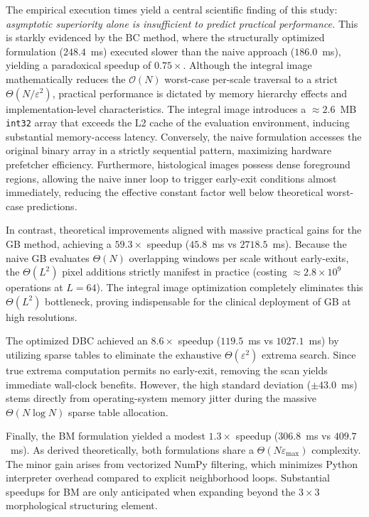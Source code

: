 The empirical execution times yield a central scientific finding of this study: \textit{asymptotic superiority alone is insufficient to predict practical performance.} This is starkly evidenced by the BC method, where the structurally optimized formulation ($248.4$~ms) executed slower than the naive approach ($186.0$~ms), yielding a paradoxical speedup of $0.75\times$. Although the integral image mathematically reduces the $\mathcal{O}(N)$ worst-case per-scale traversal to a strict $\Theta(N/\varepsilon^2)$, practical performance is dictated by memory hierarchy effects and implementation-level characteristics. The integral image introduces a $\approx 2.6$~MB \texttt{int32} array that exceeds the L2 cache of the evaluation environment, inducing substantial memory-access latency. Conversely, the naive formulation accesses the original binary array in a strictly sequential pattern, maximizing hardware prefetcher efficiency. Furthermore, histological images possess dense foreground regions, allowing the naive inner loop to trigger early-exit conditions almost immediately, reducing the effective constant factor well below theoretical worst-case predictions. 

In contrast, theoretical improvements aligned with massive practical gains for the GB method, achieving a $59.3\times$ speedup ($45.8$~ms vs $2718.5$~ms). Because the naive GB evaluates $\Theta(N)$ overlapping windows per scale without early-exits, the $\Theta(L^2)$ pixel additions strictly manifest in practice (costing $\approx 2.8 \times 10^9$ operations at $L=64$). The integral image optimization completely eliminates this $\Theta(L^2)$ bottleneck, proving indispensable for the clinical deployment of GB at high resolutions.

The optimized DBC achieved an $8.6\times$ speedup ($119.5$~ms vs $1027.1$~ms) by utilizing sparse tables to eliminate the exhaustive $\Theta(\varepsilon^2)$ extrema search. Since true extrema computation permits no early-exit, removing the scan yields immediate wall-clock benefits. However, the high standard deviation ($\pm 43.0$~ms) stems directly from operating-system memory jitter during the massive $\Theta(N \log N)$ sparse table allocation.

Finally, the BM formulation yielded a modest $1.3\times$ speedup ($306.8$~ms vs $409.7$~ms). As derived theoretically, both formulations share a $\Theta(N \varepsilon_{\max})$ complexity. The minor gain arises from vectorized NumPy filtering, which minimizes Python interpreter overhead compared to explicit neighborhood loops. Substantial speedups for BM are only anticipated when expanding beyond the $3 \times 3$ morphological structuring element.

